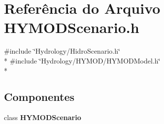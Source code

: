 \section{Referência do Arquivo H\+Y\+M\+O\+D\+Scenario.\+h}
\label{_h_y_m_o_d_scenario_8h}
{\ttfamily \#include \char`\"{}Hydrology/\+Hidro\+Scenario.\+h\char`\"{}}\\*
{\ttfamily \#include \char`\"{}Hydrology/\+H\+Y\+M\+O\+D/\+H\+Y\+M\+O\+D\+Model.\+h\char`\"{}}\\*
\subsection*{Componentes}
\begin{DoxyCompactItemize}
\item 
class {\bf H\+Y\+M\+O\+D\+Scenario}
\end{DoxyCompactItemize}
